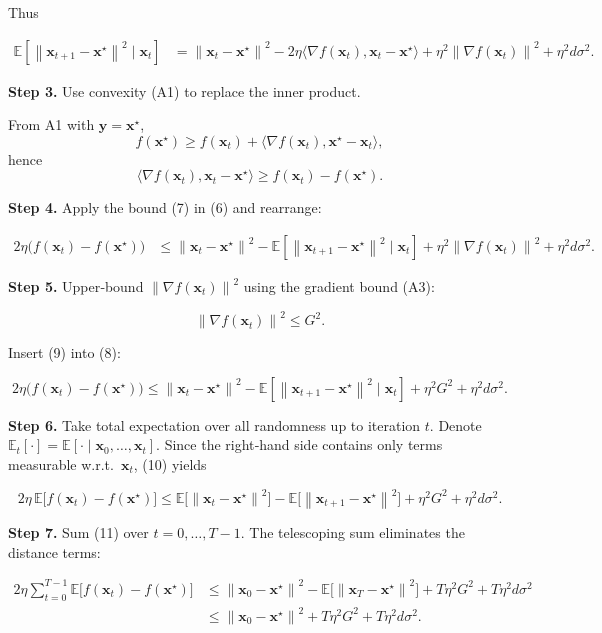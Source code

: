 \documentclass{article}
\newcommand{\E}{\mathbb{E}}
\newcommand{\norm}[1]{\left\|#1\right\|}
\newcommand{\inner}[2]{\langle #1,#2\rangle}
\newcommand{\grad}{\nabla}
\begin{document}
Thus

\[
\begin{aligned}
\E\!\left[\norm{\bm{x}_{t+1}-\bm{x}^{\star}}^{2}\mid\bm{x}_t\right]
&= \norm{\bm{x}_{t}-\bm{x}^{\star}}^{2}
   -2\eta\inner{\grad f(\bm{x}_t)}{\bm{x}_{t}-\bm{x}^{\star}}
   +\eta^{2}\norm{\grad f(\bm{x}_t)}^{2}
   +\eta^{2}d\sigma^{2}.
\tag{6}
\end{aligned}
\]

\noindent\textbf{Step 3.}  Use convexity (A1) to replace the inner product.

From A1 with $\bm{y}=\bm{x}^{\star}$,
\[
f(\bm{x}^{\star})\ge f(\bm{x}_t)+\inner{\grad f(\bm{x}_t)}{\bm{x}^{\star}-\bm{x}_t},
\]
hence
\[
\inner{\grad f(\bm{x}_t)}{\bm{x}_{t}-\bm{x}^{\star}}\ge f(\bm{x}_t)-f(\bm{x}^{\star}).
\tag{7}
\]

\noindent\textbf{Step 4.}  Apply the bound (7) in (6) and rearrange:

\[
\begin{aligned}
2\eta\bigl(f(\bm{x}_t)-f(\bm{x}^{\star})\bigr)
&\le \norm{\bm{x}_{t}-\bm{x}^{\star}}^{2}
   -\E\!\left[\norm{\bm{x}_{t+1}-\bm{x}^{\star}}^{2}\mid\bm{x}_t\right]
   +\eta^{2}\norm{\grad f(\bm{x}_t)}^{2}
   +\eta^{2}d\sigma^{2}.
\tag{8}
\end{aligned}
\]

\noindent\textbf{Step 5.}  Upper‑bound $\norm{\grad f(\bm{x}_t)}^{2}$ using the gradient bound (A3):

\[
\norm{\grad f(\bm{x}_t)}^{2}\le G^{2}.
\tag{9}
\]

Insert (9) into (8):

\[
2\eta\bigl(f(\bm{x}_t)-f(\bm{x}^{\star})\bigr)
\le \norm{\bm{x}_{t}-\bm{x}^{\star}}^{2}
   -\E\!\left[\norm{\bm{x}_{t+1}-\bm{x}^{\star}}^{2}\mid\bm{x}_t\right]
   +\eta^{2}G^{2}
   +\eta^{2}d\sigma^{2}.
\tag{10}
\]

\noindent\textbf{Step 6.}  Take total expectation over all randomness up to iteration $t$.
Denote $\E_t[\cdot]=\E[\cdot\mid\bm{x}_0,\dots,\bm{x}_t]$.
Since the right‑hand side contains only terms measurable w.r.t.\ $\bm{x}_t$, (10) yields

\[
2\eta\,\E\!\bigl[f(\bm{x}_t)-f(\bm{x}^{\star})\bigr]
\le \E\!\bigl[\norm{\bm{x}_{t}-\bm{x}^{\star}}^{2}\bigr]
   -\E\!\bigl[\norm{\bm{x}_{t+1}-\bm{x}^{\star}}^{2}\bigr]
   +\eta^{2}G^{2}
   +\eta^{2}d\sigma^{2}.
\tag{11}
\]

\noindent\textbf{Step 7.}  Sum (11) over $t=0,\dots,T-1$.
The telescoping sum eliminates the distance terms:

\[
\begin{aligned}
2\eta\sum_{t=0}^{T-1}\E\!\bigl[f(\bm{x}_t)-f(\bm{x}^{\star})\bigr]
&\le \norm{\bm{x}_{0}-\bm{x}^{\star}}^{2}
   -\E\!\bigl[\norm{\bm{x}_{T}-\bm{x}^{\star}}^{2}\bigr]
   +T\eta^{2}G^{2}
   +T\eta^{2}d\sigma^{2}\\
&\le \norm{\bm{x}_{0}-\bm{x}^{\star}}^{2}
   +T\eta^{2}G^{2}
   +T\eta^{2}d\sigma^{2}.
\tag{12}
\end{aligned}
\]
\end{document}
